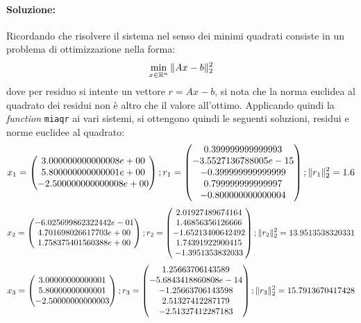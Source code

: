 \documentclass[12pt]{article}
\begin{document}
\paragraph{Soluzione:}
Ricordando che risolvere il sistema nel senso dei minimi quadrati consiste in un problema di ottimizzazione nella forma:
$$\min_{x \in \mathbb{R}^n}\Arrowvert Ax-b \Arrowvert_{2}^2$$
dove per residuo si intente un vettore  \(r=Ax-b\), si nota che la norma euclidea al quadrato dei residui non è altro che il valore all'ottimo. 
Applicando quindi la \textit{function} \texttt{miaqr} ai vari sistemi, si ottengono quindi le seguenti soluzioni, residui e norme euclidee al quadrato:
\begin{equation*} x_1=
    \begin{pmatrix}
        3.000000000000008e+00\\
        5.800000000000001e+00\\
        -2.500000000000008e+00
    \end{pmatrix}
    ;  r_1=
    \begin{pmatrix}
        0.399999999999993\\
        -3.5527136788005e-15\\
        -0.399999999999999\\
        0.799999999999997\\
        -0.800000000000004
    \end{pmatrix}
    ;  \Arrowvert r_1 \Arrowvert_{2}^2 = 1.6
\end{equation*}
\begin{equation*} x_2=
    \begin{pmatrix}
        -6.025699862322442e-01\\
        4.701698026617703e+00\\
        1.758375401560388e+00
    \end{pmatrix}
    ;  r_2=
    \begin{pmatrix}
        2.01927489674164\\
        1.46856356126666\\
        -1.65213400642492\\
        1.74391922900415\\
        -1.3951353832033
    \end{pmatrix}
    ;  \Arrowvert r_2 \Arrowvert_{2}^2 = 13.9513538320331 
\end{equation*}
\begin{equation*} x_3=
    \begin{pmatrix}
        3.00000000000001\\
        5.80000000000001\\
        -2.50000000000003
    \end{pmatrix}
    ;  r_3=
    \begin{pmatrix}
        1.25663706143589\\
        -5.6843418860808e-14\\
        -1.25663706143598\\
        2.51327412287179\\
        -2.51327412287183
    \end{pmatrix}
    ;  \Arrowvert r_3 \Arrowvert_{2}^2 = 15.7913670417428
\end{equation*}
\end{document}
